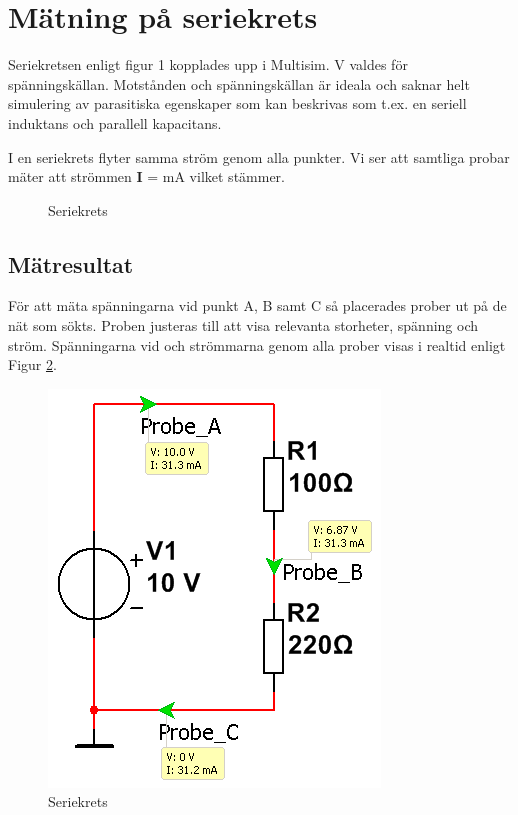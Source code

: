 \documentclass[11pt,a4paper]{article}
\begin{document}
\section{Mätning på seriekrets}\label{}
Seriekretsen enligt figur 1 kopplades upp i Multisim. \unit[10]{\si{\volt}}
valdes för spänningskällan.
Motstånden och spänningskällan är ideala och saknar helt simulering av parasitiska
egenskaper som kan beskrivas som t.ex. en seriell induktans och parallell kapacitans.
\cite{ednarticle}

\par I en seriekrets flyter samma ström genom alla punkter. Vi ser att samtliga probar
mäter att strömmen \textbf{I} = \unit[31,3]{\si{\mA}} vilket stämmer.

\begin{figure}[htbp]
    \centering
    \caption{Seriekrets}
    \label{fig:1-mm-schem}
\end{figure}


\subsection{Mätresultat}\label{}
För att mäta spänningarna vid punkt A, B samt C så placerades prober ut på de
nät som sökts. Proben justeras till att visa relevanta storheter, spänning och
ström.
Spänningarna vid och strömmarna genom alla prober visas i realtid enligt 
Figur \ref{fig:sim2}.

\begin{figure}[htbp]
    \centering
    \includegraphics[scale=0.5]{ee466multisim/1.png}
    \caption{Seriekrets}
    \label{fig:sim2}
\end{figure}
\end{document}
